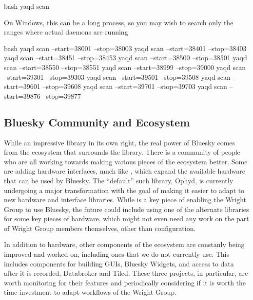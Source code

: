 \begin{codefragment}{bash}
yaqd scan
\end{codefragment}

On Windows, this can be a long process, so you may wish to search only the ranges where actual daemons are running

\begin{codefragment}{bash}
yaqd scan --start=38001 --stop=38003
yaqd scan --start=38401 --stop=38403
yaqd scan --start=38451 --stop=38453
yaqd scan --start=38500 --stop=38501
yaqd scan --start=38550 --stop=38551
yaqd scan --start=38999 --stop=39000
yaqd scan --start=39301 --stop=39303
yaqd scan --start=39501 --stop=39508
yaqd scan --start=39601 --stop=39608
yaqd scan --start=39701 --stop=39703
yaqd scan --start=39876 --stop=39877
\end{codefragment}

\subsection{Bluesky Community and Ecosystem}

While an impressive library in its own right, the real power of Bluesky comes from the ecosystem that surrounds the library.
There is a community of people who are all working towards making various pieces of the ecosystem better.
Some are adding hardware interfaces, much like \yaqcbluesky{}, which expand the available hardware that can be used by Bluesky.
The ``default'' such library, Ophyd\cite{Lauer2020}, is currently undergoing a major transformation with the goal of making it easier to adapt to new hardware and interface libraries\cite{NOBUGS_Ophyd_v2}.
While \yaq{} is a key piece of enabling the Wright Group to use Bluesky, the future could include using one of the alternate libraries for some key pieces of hardware, which might not even need any work on the part of Wright Group members themselves, other than configuration.

In addition to hardware, other components of the ecosystem are constanly being improved and worked on, including ones that we do not currently use.
This includes components for building GUIs, Bluesky Widgets, and access to data after it is recorded, Databroker and Tiled.
These three projects, in particular, are worth monitoring for their features and periodically considering if it is worth the time investment to adapt workflows of the Wright Group.

